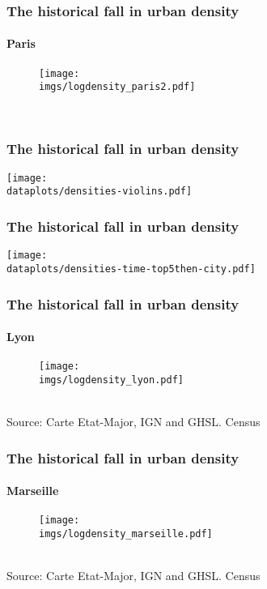 \documentclass[aspectratio=169]{beamer}
\begin{document}
\begin{frame}[label=Paris]
\frametitle{The historical fall in urban density}
\framesubtitle{Paris}
\begin{figure}
	\begin{center}
		\texttt{[image: \\imgs/logdensity\_paris2.pdf]}
	\end{center}
\end{figure}
\hspace{-1cm}
\hyperlink{density}{}\\
\end{frame}

\begin{frame}[label=violins]
\frametitle{The historical fall in urban density}
	\begin{center}
		\texttt{[image: \\dataplots/densities-violins.pdf]}
	\end{center}
\hyperlink{density}{}
\end{frame}

\begin{frame}[label=Top5]
\frametitle{The historical fall in urban density}
	\begin{center}
		\texttt{[image: \\dataplots/densities-time-top5then-city.pdf]}
	\end{center}
\hyperlink{density}{}
\end{frame}

\begin{frame}[label=Lyon]
\frametitle{The historical fall in urban density}
\framesubtitle{Lyon}
\begin{figure}
	\begin{center}
		\texttt{[image: \\imgs/logdensity\_lyon.pdf]}
	\end{center}
\end{figure}
\hyperlink{density}{}\\
{\tiny Source: Carte Etat-Major, IGN and GHSL. Census}
\end{frame}

\begin{frame}[label=Marseille]
\frametitle{The historical fall in urban density}
\framesubtitle{Marseille}
\begin{figure}
	\begin{center}
		\texttt{[image: \\imgs/logdensity\_marseille.pdf]}
	\end{center}
\end{figure}
\hyperlink{density}{}\\
{\tiny Source: Carte Etat-Major, IGN and GHSL. Census}
\end{frame}
\end{document}
